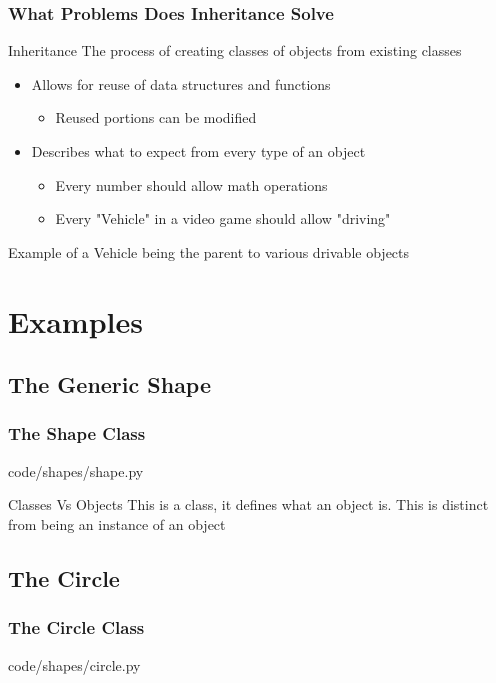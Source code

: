 \documentclass{beamer}
\begin{document}
  \begin{frame}
    \frametitle{What Problems Does Inheritance Solve}
    \begin{block}{Inheritance}
      The process of creating classes of objects from existing classes
    \end{block}
    \begin{itemize}
      \item<1->Allows for reuse of data structures and functions
        \begin{itemize}
          \item Reused portions can be modified
        \end{itemize}
      \item<2->Describes what to expect from every type of an object
        \begin{itemize}
          \item Every number should allow math operations
          \item Every "Vehicle" in a video game should allow "driving"
        \end{itemize}
    \end{itemize}
    \pause
    Example of a Vehicle being the parent to various drivable objects
  \end{frame}

\section{Examples}
\subsection{The Generic Shape}
  \begin{frame}
    \frametitle{The Shape Class}
    code/shapes/shape.py
    
    \begin{block}{Classes Vs Objects}
      This is a class, it defines what an object is.
      This is distinct from being an instance of an object
    \end{block}
  \end{frame}
\subsection{The Circle}
  \begin{frame}
    \frametitle{The Circle Class}
    code/shapes/circle.py
    
  \end{frame}
\end{document}
